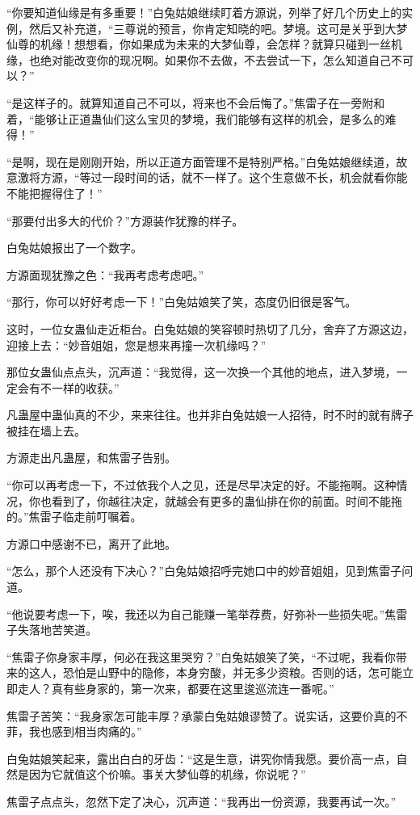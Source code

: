 \begin{this_body}
“你要知道仙缘是有多重要！”白兔姑娘继续盯着方源说，列举了好几个历史上的实例，然后又补充道，“三尊说的预言，你肯定知晓的吧。梦境。这可是关乎到大梦仙尊的机缘！想想看，你如果成为未来的大梦仙尊，会怎样？就算只碰到一丝机缘，也绝对能改变你的现况啊。如果你不去做，不去尝试一下，怎么知道自己不可以？”

“是这样子的。就算知道自己不可以，将来也不会后悔了。”焦雷子在一旁附和着，“能够让正道蛊仙们这么宝贝的梦境，我们能够有这样的机会，是多么的难得！”

“是啊，现在是刚刚开始，所以正道方面管理不是特别严格。”白兔姑娘继续道，故意激将方源，“等过一段时间的话，就不一样了。这个生意做不长，机会就看你能不能把握得住了！”

“那要付出多大的代价？”方源装作犹豫的样子。

白兔姑娘报出了一个数字。

方源面现犹豫之色：“我再考虑考虑吧。”

“那行，你可以好好考虑一下！”白兔姑娘笑了笑，态度仍旧很是客气。

这时，一位女蛊仙走近柜台。白兔姑娘的笑容顿时热切了几分，舍弃了方源这边，迎接上去：“妙音姐姐，您是想来再撞一次机缘吗？”

那位女蛊仙点点头，沉声道：“我觉得，这一次换一个其他的地点，进入梦境，一定会有不一样的收获。”

凡蛊屋中蛊仙真的不少，来来往往。也并非白兔姑娘一人招待，时不时的就有牌子被挂在墙上去。

方源走出凡蛊屋，和焦雷子告别。

“你可以再考虑一下，不过依我个人之见，还是尽早决定的好。不能拖啊。这种情况，你也看到了，你越往决定，就越会有更多的蛊仙排在你的前面。时间不能拖的。”焦雷子临走前叮嘱着。

方源口中感谢不已，离开了此地。

“怎么，那个人还没有下决心？”白兔姑娘招呼完她口中的妙音姐姐，见到焦雷子问道。

“他说要考虑一下，唉，我还以为自己能赚一笔举荐费，好弥补一些损失呢。”焦雷子失落地苦笑道。

“焦雷子你身家丰厚，何必在我这里哭穷？”白兔姑娘笑了笑，“不过呢，我看你带来的这人，恐怕是山野中的隐修，本身穷酸，并无多少资粮。否则的话，怎可能立即走人？真有些身家的，第一次来，都要在这里逡巡流连一番呢。”

焦雷子苦笑：“我身家怎可能丰厚？承蒙白兔姑娘谬赞了。说实话，这要价真的不菲，我也感到相当肉痛的。”

白兔姑娘笑起来，露出白白的牙齿：“这是生意，讲究你情我愿。要价高一点，自然是因为它就值这个价嘛。事关大梦仙尊的机缘，你说呢？”

焦雷子点点头，忽然下定了决心，沉声道：“我再出一份资源，我要再试一次。”

\end{this_body}

